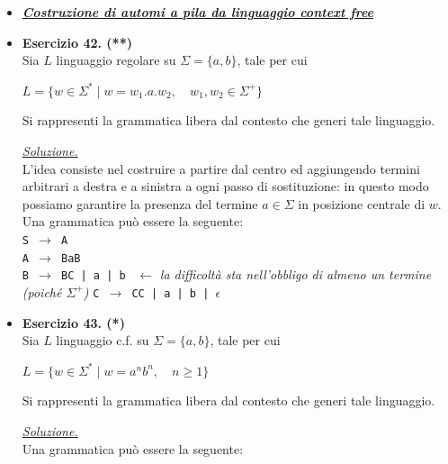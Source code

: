 \documentclass[a4paper,10pt]{article}
\begin{document}
{\normalsize
\begin{itemize}[label=, leftmargin=0pt]

\item \underline{\textit{\textbf{Costruzione di automi a pila da linguaggio context free}}}

    \item  \textbf{Esercizio 42. (**)}\\ 
    Sia $L$ linguaggio regolare su $\Sigma=\{a,b\}$, tale per cui 
    {\begin{center}
        $L = \{ w\in \Sigma^* \mid w=w_1.a.w_2,\quad w_1, w_2\in \Sigma^+\}$\\
    \end{center}}
    Si rappresenti la grammatica libera dal contesto che generi tale linguaggio.\\
    \begin{osservazioni}
    \underline{\textit{Soluzione.}} \\
    L'idea consiste nel costruire a partire dal centro ed aggiungendo termini arbitrari a destra e a sinistra a ogni passo di sostituzione: in questo modo possiamo garantire la presenza del termine $a\in\Sigma$ in posizione centrale di $w$.\\
    Una grammatica può essere la seguente:\\
    
    \texttt{S $\rightarrow$ A}\\
    \texttt{A $\rightarrow$ BaB}\\
    \texttt{B $\rightarrow$ BC | a | b } $\leftarrow$ \textit{la difficoltà sta nell'obbligo di almeno un termine (poiché $\Sigma^+$)}
    \texttt{C $\rightarrow$ CC | a | b | $\epsilon$}
    
    \end{osservazioni}
    
    \item  \textbf{Esercizio 43. (*)}\\ 
    Sia $L$ linguaggio c.f. su $\Sigma=\{a,b\}$, tale per cui 
    {\begin{center}
        $L = \{ w\in \Sigma^* \mid w=a^nb^n,\quad n\geq1\}$\\
    \end{center}}
    Si rappresenti la grammatica libera dal contesto che generi tale linguaggio.
    
    \begin{osservazioni}
    \underline{\textit{Soluzione.}} \\
    Una grammatica può essere la seguente:\\
    

\end{osservazioni}
\end{itemize}}
\end{document}
